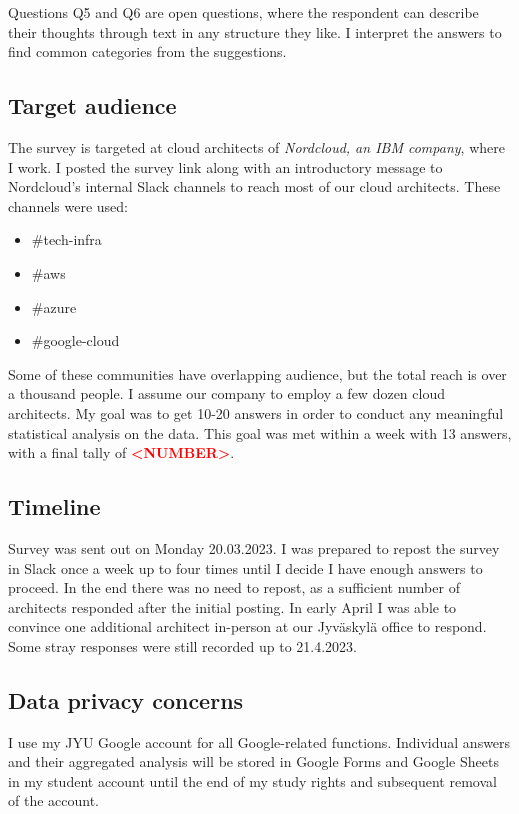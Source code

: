 \documentclass[utf8,english]{gradu3}
\newcommand{\todo}[1]{\textbf{\textcolor{red}{#1}}}
\begin{document}
Questions Q5 and Q6 are open questions, where the respondent can describe their
thoughts through text in any structure they like.
I interpret the answers to find common categories from the suggestions.

\subsection{Target audience}
The survey is targeted at cloud architects of \textit{Nordcloud, an IBM company}, where I work.
I posted the survey link along with an introductory message to Nordcloud's
internal Slack channels to reach most of our cloud architects.
These channels were used:
\begin{itemize}
  \item \#tech-infra
  \item \#aws
  \item \#azure
  \item \#google-cloud
\end{itemize}

Some of these communities have overlapping audience, but the total reach is over a thousand people.
I assume our company to employ a few dozen cloud architects.
My goal was to get 10-20 answers in order to conduct any meaningful statistical analysis on
the data.
This goal was met within a week with 13 answers, with a final tally of \todo{<NUMBER>}.

\subsection{Timeline}
Survey was sent out on Monday 20.03.2023.
I was prepared to repost the survey in Slack once a week up to four times until I
decide I have enough answers to proceed.
In the end there was no need to repost, as a sufficient number of architects
responded after the initial posting.
In early April I was able to convince one additional architect in-person at our
Jyväskylä office to respond.
Some stray responses were still recorded up to 21.4.2023.

\subsection{Data privacy concerns}
I use my JYU Google account for all Google-related functions.
Individual answers and their aggregated analysis will be stored in Google Forms and
Google Sheets in my student account until the end of my study rights and
subsequent removal of the account.
\end{document}
